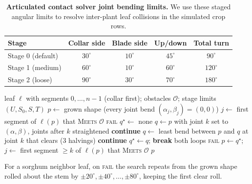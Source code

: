 \documentclass[10pt,twocolumn,letterpaper]{article}
\newcommand{\Meets}{\textsc{Meets}}
\begin{document}
\begin{table}[h]
  \caption{\textbf{Articulated contact solver joint bending limits.} We use these staged angular limits to resolve inter-plant leaf collisions in the simulated crop rows.}
  \label{tab:supp-stages}\label{tab:supp-solver_limits}
  \centering\scriptsize
  \setlength{\tabcolsep}{3pt}
  \begin{tabular}{lcccc}
  \toprule
  Stage & Collar side & Blade side & Up/down & Total turn \\
  \midrule
  Stage 0 (default) & $30^\circ$ & $10^\circ$ & $45^\circ$ & $90^\circ$ \\
  Stage 1 (medium)  & $60^\circ$ & $10^\circ$ & $60^\circ$ & $120^\circ$ \\
  Stage 2 (loose)   & $90^\circ$ & $30^\circ$ & $70^\circ$ & $180^\circ$ \\
  \bottomrule
  \end{tabular}
\end{table}

\begin{algorithm}[t]
\caption{\textsc{BendClear}: Minimum-deviation collision-free leaf shape}\label{alg:supp-bend}
\footnotesize
\begin{algorithmic}[1]
\Require leaf $\ell$ with segments $0,\dots,n{-}1$ (collar first); obstacles $\mathcal O$; stage limits $(U,S_0,S,T)$
\State $p \gets$ grown shape (every joint bend $(\alpha_j,\beta_j)=(0,0)$)
\State $j \gets$ first segment of $\ell(p)$ that \Meets{} $\mathcal O$ 
   \Return \textsc{fail} \EndIf
  \State $q^\star \gets$ none
   
      \State $q \gets p$ with joint $k$ set to $(\alpha,\beta)$, joints after $k$ straightened
      \If{$\sum_i \|(\alpha_i,\beta_i)\| > T$ \textbf{or} segs.\ $k..j$ of $\ell(q)$ \Meets{} $\mathcal O$}
        \State \textbf{continue}
      \EndIf
      \State $q \gets$ least bend between $p$ and $q$ at joint $k$ that clears (3 halvings)
        \State \textbf{continue}
      \EndIf
      \State $q^\star \gets q$; \textbf{break} both loops
    \EndFor
  \EndFor
   \Return \textsc{fail} \EndIf
  \State $p \gets q^\star$; \quad $j \gets$ first segment $\ge k$ of $\ell(p)$ that \Meets{} $\mathcal O$
\EndWhile
\State \Return $p$
\end{algorithmic}
\noindent\footnotesize For a sorghum neighbor leaf, on \textsc{fail} the search repeats from the grown shape rolled about the stem by $\pm20^\circ,\pm40^\circ,\dots,\pm80^\circ$, keeping the first clear roll.
\end{algorithm}
\end{document}
